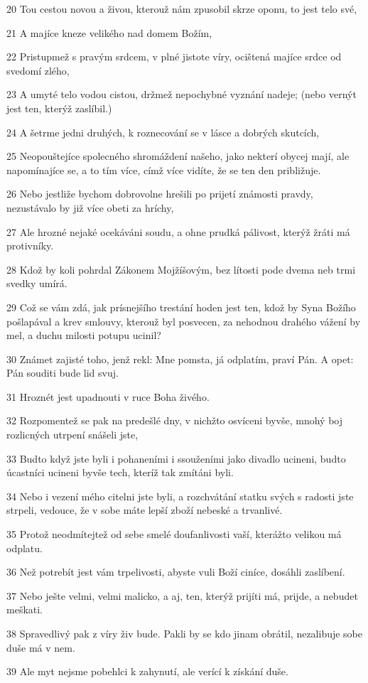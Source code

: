 \par 20 Tou cestou novou a živou, kterouž nám zpusobil skrze oponu, to jest telo své,
\par 21 A majíce kneze velikého nad domem Božím,
\par 22 Pristupmež s pravým srdcem, v plné jistote víry, ocištená majíce srdce od svedomí zlého,
\par 23 A umyté telo vodou cistou, držmež nepochybné vyznání nadeje; (nebo vernýt jest ten, kterýž zaslíbil.)
\par 24 A šetrme jedni druhých, k roznecování se v lásce a dobrých skutcích,
\par 25 Neopouštejíce spolecného shromáždení našeho, jako nekterí obycej mají, ale napomínajíce se, a to tím více, címž více vidíte, že se ten den približuje.
\par 26 Nebo jestliže bychom dobrovolne hrešili po prijetí známosti pravdy, nezustávalo by již více obeti za hríchy,
\par 27 Ale hrozné nejaké ocekáváni soudu, a ohne prudká pálivost, kterýž žráti má protivníky.
\par 28 Kdož by koli pohrdal Zákonem Mojžíšovým, bez lítosti pode dvema neb trmi svedky umírá.
\par 29 Což se vám zdá, jak prísnejšího trestání hoden jest ten, kdož by Syna Božího pošlapával a krev smlouvy, kterouž byl posvecen, za nehodnou drahého vážení by mel, a duchu milosti potupu ucinil?
\par 30 Známet zajisté toho, jenž rekl: Mne pomsta, já odplatím, praví Pán. A opet: Pán souditi bude lid svuj.
\par 31 Hroznét jest upadnouti v ruce Boha živého.
\par 32 Rozpomentež se pak na predešlé dny, v nichžto osvíceni byvše, mnohý boj rozlicných utrpení snášeli jste,
\par 33 Budto když jste byli i pohaneními i ssouženími jako divadlo ucineni, budto úcastníci ucineni byvše tech, kteríž tak zmítáni byli.
\par 34 Nebo i vezení mého citelni jste byli, a rozchvátání statku svých s radosti jste strpeli, vedouce, že v sobe máte lepší zboží nebeské a trvanlivé.
\par 35 Protož neodmítejtež od sebe smelé doufanlivosti vaší, kterážto velikou má odplatu.
\par 36 Než potrebít jest vám trpelivosti, abyste vuli Boží ciníce, dosáhli zaslíbení.
\par 37 Nebo ješte velmi, velmi malicko, a aj, ten, kterýž prijíti má, prijde, a nebudet meškati.
\par 38 Spravedlivý pak z víry živ bude. Pakli by se kdo jinam obrátil, nezalibuje sobe duše má v nem.
\par 39 Ale myt nejsme pobehlci k zahynutí, ale verící k získání duše.

